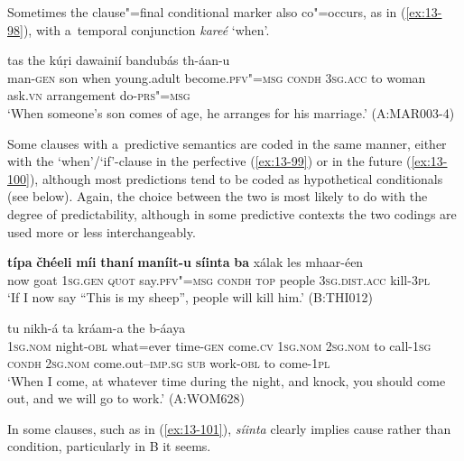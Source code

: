 Sometimes the clause"=final conditional marker also co"=occurs, as in (\ref{ex:13-98}), with a~temporal conjunction \textit{kareé} `when'. 

\begin{exe}
\ex
\label{ex:13-98}
  tas the kúṛi dawainií
bandubás  th-áan-u \\
man-\textsc{gen} son when young.adult become.\textsc{pfv"=msg} \textsc{condh} \textsc{3sg.acc} to woman ask.\textsc{vn} arrangement do-\textsc{prs"=msg}  \\
\glt `When someone's son comes of age, he arranges for his marriage.' (A:MAR003-4) 
\end{exe}

Some clauses with a~predictive semantics are coded in the same manner, either with the `when'/`if'-clause in the perfective (\ref{ex:13-99}) or in the future (\ref{ex:13-100}), although most predictions tend to be coded as hypothetical conditionals (see below). Again, the choice between the two is most likely to do with the degree of predictability, although in some predictive contexts the two codings are used more or less interchangeably.

\begin{exe}
\ex
\label{ex:13-99}
\gll \textbf{típa} \textbf{čhéeli} \textbf{míi} \textbf{thaní} \textbf{maníit-u} \textbf{síinta} \textbf{ba}  xálak les mhaar-éen \\
now goat \textsc{1sg.gen} \textsc{quot} say.\textsc{pfv"=msg} \textsc{condh} \textsc{top} people \textsc{3sg.dist.acc} kill-\textsc{3pl} \\
\glt `If I now say ``This is my sheep'', people will kill him.' (B:THI012)

\ex
\label{ex:13-100}
\gll [ma róot-a ɡá=ɡala ṭeem-íi yhaí ma  tu the ṭaak-úum seentá] tu
nikh-á  ta kráam-a the b-áaya \\
\textsc{1sg.nom} night-\textsc{obl} what=ever time-\textsc{gen} come.\textsc{cv} \textsc{1sg.nom}  \textsc{2sg.nom} to call-\textsc{1sg} \textsc{condh} \textsc{2sg.nom} come.out--\textsc{imp.sg}  \textsc{sub} work-\textsc{obl} to come-\textsc{1pl} \\
\glt `When I come, at whatever time during the night, and knock, you should come out, and we will go to work.' (A:WOM628) 
\end{exe}

In some clauses, such as in (\ref{ex:13-101}), \textit{síinta} clearly implies cause rather than condition, particularly in B it seems.

